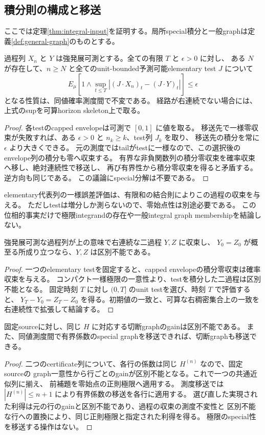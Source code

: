 \subsection{積分則の構成と移送}
\label{sec:integral-calculus}
ここでは定理\ref{thm:integral-input}を証明する。局所special積分と一般graphは定義\ref{def:general-graph}のものとする。

\begin{lemma}
過程列 $X_n$ と $Y$ は強発展可測とする。全ての有限 $T$ と $\epsilon>0$ に対し、
ある $N$ が存在して、$n\ge N$ と全てのunit-bounded予測可能elementary test $J$ について
\[
 E_\mu\left[1\wedge\sup_{t\le T}
   |(J\mathbin{\cdot}X_n)_t-(J\mathbin{\cdot}Y)_t|\right]\le\epsilon
\]
となる性質は、同値確率測度間で不変である。
経路が右連続でない場合には、上式のsupを可算horizon skeleton上で取る。
\end{lemma}
\begin{proof}
各testのcapped envelopeは可測で $[0,1]$ に値を取る。
移送先で一様零収束が失敗すれば、ある $\epsilon>0$ と $n_k\ge k$、test列 $J_k$ を取り、
移送先の積分を常に $\epsilon$ より大きくできる。
元の測度ではtailがtestに一様なので、この選択後のenvelope列の積分も零へ収束する。
有界な非負関数列の積分零収束を確率収束へ移し、絶対連続性で移送し、
再び有界性から積分零収束を得ると矛盾する。逆方向も同じである。
この議論にspecial分解は不要である。
\end{proof}
elementary代表列の一様誤差評価は、有限和の結合則によりこの過程の収束を与える。
ただしtestは増分しか測らないので、零始点性は別途必要である。
この位相的事実だけで極限integrandの存在や一般integral graph membershipを結論しない。

\begin{lemma}[初期値を固定した極限の一意性]
強発展可測な過程列が上の意味で右連続な二過程 $Y,Z$ に収束し、
$Y_0=Z_0$ が概至る所成り立つなら、$Y,Z$ は区別不能である。
\end{lemma}
\begin{proof}
一つのelementary testを固定すると、capped envelopeの積分零収束は確率収束を与える。
コンパクト一様極限の一意性より、testを積分した二過程は区別不能となる。
固定時刻 $T$ に対し $(0,T]$ のunit testを選び、時刻 $T$ で評価すると、
$Y_T-Y_0=Z_T-Z_0$ を得る。初期値の一致と、可算な右稠密集合上の一致を右連続性で拡張して結論する。
\end{proof}

\begin{proposition}[切断graphの一意性と移送の還元]
固定sourceに対し、同じ $H$ に対応する切断graphのgainは区別不能である。
また、同値測度間で有界係数のspecial graphを移送できれば、切断graphも移送できる。
\end{proposition}
\begin{proof}
二つのcertificate列について、各行の係数は同じ $H^{(n)}$ なので、固定sourceの
graph一意性から行ごとのgainが区別不能となる。これで一つの共通近似列に揃え、
前補題を零始点の正則極限へ適用する。
測度移送では $|H^{(n)}|\le n+1$ により有界係数の移送を各行に適用する。
選び直した実現された利得は元の行のgainと区別不能であり、過程の収束の測度不変性と
区別不能な行への置換により、同じ正則極限と指定された利得を得る。
極限のspecial性を移送する操作はない。
\end{proof}

